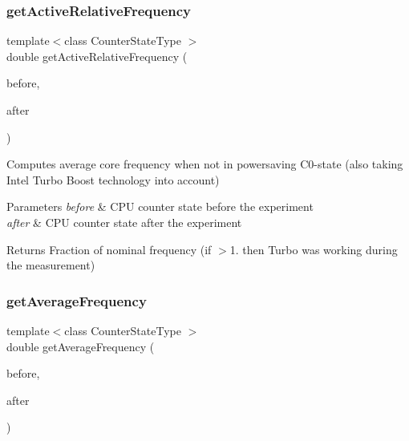 \subsubsection{get\+Active\+Relative\+Frequency}
{\footnotesize\ttfamily template$<$class Counter\+State\+Type $>$ \\
double get\+Active\+Relative\+Frequency (\begin{DoxyParamCaption}\item[{const Counter\+State\+Type \&}]{before,  }\item[{const Counter\+State\+Type \&}]{after }\end{DoxyParamCaption})\hspace{0.3cm}{\ttfamily [friend]}}



Computes average core frequency when not in powersaving C0-\/state (also taking Intel Turbo Boost technology into account) 


\begin{DoxyParams}{Parameters}
{\em before} & C\+PU counter state before the experiment \\
\hline
{\em after} & C\+PU counter state after the experiment \\
\hline
\end{DoxyParams}
\begin{DoxyReturn}{Returns}
Fraction of nominal frequency (if $>$1. then Turbo was working during the measurement) 
\end{DoxyReturn}
\mbox{\label{classBasicCounterState_aa398facfd523b7dcdbf827a74970a88c}} 
\subsubsection{get\+Average\+Frequency}
{\footnotesize\ttfamily template$<$class Counter\+State\+Type $>$ \\
double get\+Average\+Frequency (\begin{DoxyParamCaption}\item[{const Counter\+State\+Type \&}]{before,  }\item[{const Counter\+State\+Type \&}]{after }\end{DoxyParamCaption})\hspace{0.3cm}{\ttfamily [friend]}}



